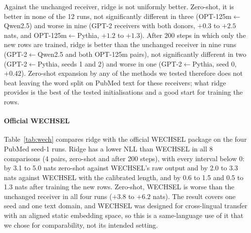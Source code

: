 \documentclass[preprint,12pt]{elsarticle}
\begin{document}
Against the unchanged receiver, ridge is not uniformly better. Zero-shot, it is better in none of the 12 runs, not significantly different in three (OPT-125m$\leftarrow$Qwen2.5) and worse in nine (GPT-2 receivers with both donors, $+0.3$ to $+2.5$ nats, and OPT-125m$\leftarrow$Pythia, $+1.2$ to $+1.3$). After 200 steps in which only the new rows are trained, ridge is better than the unchanged receiver in nine runs (GPT-2$\leftarrow$Qwen2.5 and both OPT-125m pairs), not significantly different in two (GPT-2$\leftarrow$Pythia, seeds 1 and 2) and worse in one (GPT-2$\leftarrow$Pythia, seed 0, $+0.42$). Zero-shot expansion by any of the methods we tested therefore does not beat leaving the word split on PubMed text for these receivers; what ridge provides is the best of the tested initialisations and a good start for training the rows.

\paragraph{Official WECHSEL} Table~\ref{tab:wech} compares ridge with the official WECHSEL package on the four PubMed seed-1 runs. Ridge has a lower NLL than WECHSEL in all 8 comparisons (4 pairs, zero-shot and after 200 steps), with every interval below 0: by 3.1 to 5.0 nats zero-shot against WECHSEL's raw output and by 2.0 to 3.3 nats against WECHSEL with the calibrated length, and by 0.6 to 1.5 and 0.5 to 1.3 nats after training the new rows. Zero-shot, WECHSEL is worse than the unchanged receiver in all four runs ($+3.8$ to $+6.2$ nats). The result covers one seed and one text domain, and WECHSEL was designed for cross-lingual transfer with an aligned static embedding space, so this is a same-language use of it that we chose for comparability, not its intended setting.
\begin{table}[t]
\centering\small
\caption{Official WECHSEL against ridge, PubMed seed 1 (NLL per sentence in nats; negative in the first two columns = ridge better). Intervals are 95\,\% paired bootstrap; $^{*}$ excludes 0.}
\label{tab:wech}
\resizebox{\textwidth}{!}{}
\end{table}
\end{document}
